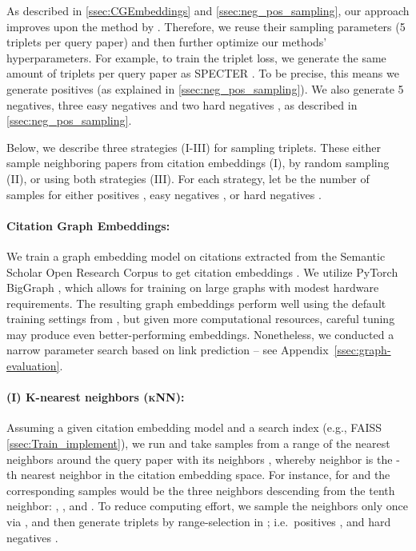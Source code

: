 \documentclass[11pt]{article}
\newcommand{\knn}{\textsc{kNN}\xspace}
\begin{document}
As described in \cref{ssec:CGEmbeddings} and \cref{ssec:neg_pos_sampling}, our approach improves upon the method by \citet{Cohan2020}. Therefore, we reuse their sampling parameters (5 triplets per query paper) and then further optimize our methods' hyperparameters.
For example, to train the triplet loss, we generate the same amount of  triplets per query paper as SPECTER \cite{Cohan2020}. To be precise, this means we generate  positives (as explained in \cref{ssec:neg_pos_sampling}). We also generate 5 negatives, three easy negatives  and two hard negatives , as described in \cref{ssec:neg_pos_sampling}.

Below, we describe three strategies (I-III) for sampling triplets. 
These either sample neighboring papers from citation embeddings (I), by random sampling (II), or using both strategies (III).
For each strategy, let  be the number of samples for either positives , easy negatives , or hard negatives .

\paragraph{Citation Graph Embeddings:}
We train a graph embedding model  on citations extracted from the Semantic Scholar Open Research Corpus \citep[S2ORC; ][]{Lo2020} to get citation embeddings .
We utilize PyTorch BigGraph \cite{Lerer2019}, which allows for training on large graphs with modest hardware requirements.
The resulting graph embeddings perform well using the default training settings from \citet{Lerer2019}, but given more computational resources, careful tuning may produce even better-performing embeddings.
Nonetheless, we conducted a narrow parameter search based on link prediction -- see Appendix~\ref{ssec:graph-evaluation}.

\paragraph{(I) K-nearest neighbors (\knn):} 
Assuming a given citation embedding model  and a search index (e.g., FAISS \cref{ssec:Train_implement}), we run  and take  samples from a range of the  nearest neighbors around the query paper
 with its neighbors , whereby neighbor  is the -th nearest neighbor in the citation embedding space.
For instance, for  and  the corresponding samples would be the three neighbors descending from the tenth neighbor: , , and . 
To reduce computing effort, we sample the neighbors  only once via , and then generate triplets by range-selection in ; i.e.\ positives , and hard negatives .
\end{document}
